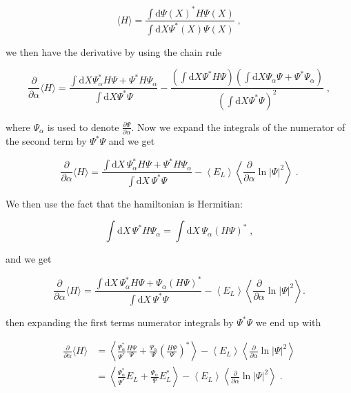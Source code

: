 \begin{equation}
  \langle H \rangle = \frac{\int \mathrm{d}\Psi(X)^* H \Psi(X)}{\int\mathrm{d}X \Psi^*(X)\Psi(X)} \; ,
  \label{eq:expected_hamiltonian}
\end{equation}

we then have the derivative by using the chain rule

\begin{equation}
  \frac{\partial}{\partial{\alpha}}\langle H \rangle = \frac{\int\mathrm{d}X \Psi^*_{\alpha}H\Psi + \Psi^*H\Psi_{\alpha}}{\int\mathrm{d}X\Psi^*\Psi} - \frac{\left ( \int\mathrm{d}X\Psi^*H\Psi\right )\left ( \int\mathrm{d}X\Psi_{\alpha}\Psi + \Psi^*\Psi_{\alpha}\right )}{\left ( \int\mathrm{d}X\Psi^*\Psi\right )^2} \; ,
  \label{eq:expected_derivative}
\end{equation}

 where $\Psi_{\alpha}$ is used to denote $\frac{\partial\Psi}{\partial\alpha}$. Now we expand the integrals of the numerator of the second term by $\Psi^*\Psi$ and we get

\begin{equation}
  \frac{\partial}{\partial\alpha} \langle H\rangle = 
\frac{\int \mathrm{d}X\, \Psi_\alpha^* H \Psi + \Psi^* H\Psi_\alpha}{\int \mathrm{d}X\, \Psi^* \Psi }
- \left\langle E_L\right\rangle \left\langle \frac{\partial}{\partial\alpha} \ln |\Psi|^2\right\rangle \; .
  \label{eq:first_expand}
\end{equation}

We then use the fact that the hamiltonian is Hermitian:

\begin{equation}
  \int \mathrm{d}X\, \Psi^* H\Psi_\alpha=\int \mathrm{d}X\, \Psi_\alpha (H\Psi)^* \; ,
  \label{eq:Hermitian_hamiltonian}
\end{equation}

and we get

\begin{equation}
  \frac{\partial}{\partial\alpha} \langle H\rangle = 
\frac{\int \mathrm{d}X\, \Psi_\alpha^* H \Psi + \Psi_\alpha (H\Psi)^*}{\int \mathrm{d}X\, \Psi^* \Psi }
- \left\langle E_L\right\rangle \left\langle \frac{\partial}{\partial\alpha} \ln |\Psi|^2\right\rangle .
  \label{eq:first_expand_hermit}
\end{equation}

then expanding the first terms numerator integrals by $\Psi^*\Psi$ we end up with

\begin{align}
\frac{\partial}{\partial\alpha} \langle H\rangle &= 
\left\langle \frac{\Psi_\alpha^*}{\Psi^*} \frac{H \Psi}{\Psi}+ \frac{\Psi_\alpha}{\Psi} \left(\frac{H\Psi}{\Psi}\right)^*\right\rangle
- \left\langle E_L\right\rangle \left\langle \frac{\partial}{\partial\alpha} \ln |\Psi|^2\right\rangle
\\
 &= 
\left\langle \frac{\Psi_\alpha^*}{\Psi^*} E_L+ \frac{\Psi_\alpha}{\Psi} E_L^*\right\rangle
- \left\langle E_L\right\rangle \left\langle \frac{\partial}{\partial\alpha} \ln |\Psi|^2\right\rangle \; .
\end{align}

